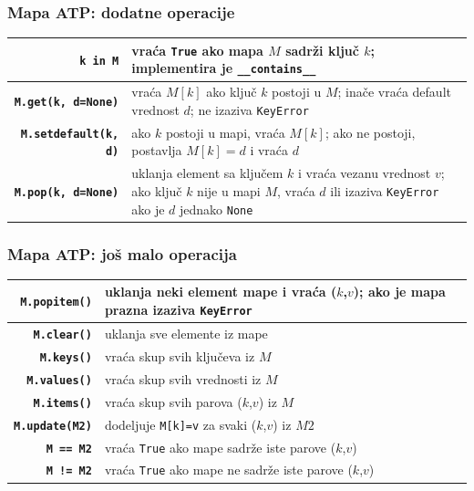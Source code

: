 \documentclass[compress,aspectratio=169]{beamer}
\begin{document}
\begin{frame}[fragile]
  \frametitle{Mapa ATP: dodatne operacije}
  \begin{center}
    \begin{tabular}{rp{10cm}}
      \textbf{\texttt{k in M}} & vraća \texttt{True} ako mapa $M$ sadrži ključ $k$; implementira je \texttt{\_\_contains\_\_} \\ \hline
      \textbf{\texttt{M.get(k, d=None)}} & vraća $M[k]$ ako ključ $k$ postoji u $M$; inače vraća default vrednost $d$; ne izaziva \texttt{KeyError} \\ \hline
      \textbf{\texttt{M.setdefault(k, d)}} & ako $k$ postoji u mapi, vraća $M[k]$; ako ne postoji, postavlja $M[k]=d$ i vraća $d$ \\ \hline
      \textbf{\texttt{M.pop(k, d=None)}} & uklanja element sa ključem $k$ i vraća vezanu vrednost $v$; ako ključ $k$ nije u mapi $M$, vraća $d$ ili izaziva \texttt{KeyError} ako je $d$ jednako \texttt{None}
    \end{tabular}
  \end{center}
\end{frame}

\begin{frame}[fragile]
  \frametitle{Mapa ATP: još malo operacija}
  \begin{center}
    \begin{tabular}{rp{11cm}}
      \textbf{\texttt{M.popitem()}} & uklanja neki element mape i vraća ($k$,$v$); ako je mapa prazna izaziva \texttt{KeyError} \\ \hline
      \textbf{\texttt{M.clear()}} & uklanja sve elemente iz mape \\ \hline
      \textbf{\texttt{M.keys()}} & vraća skup svih ključeva iz $M$ \\ \hline
      \textbf{\texttt{M.values()}} & vraća skup svih vrednosti iz $M$ \\ \hline
      \textbf{\texttt{M.items()}} & vraća skup svih parova ($k$,$v$) iz $M$ \\ \hline
      \textbf{\texttt{M.update(M2)}} & dodeljuje \texttt{M[k]=v} za svaki ($k$,$v$) iz $M2$ \\ \hline
      \textbf{\texttt{M == M2}} & vraća \texttt{True} ako mape sadrže iste parove ($k$,$v$) \\ \hline
      \textbf{\texttt{M != M2}} & vraća \texttt{True} ako mape ne sadrže iste parove ($k$,$v$)
    \end{tabular}
  \end{center}
\end{frame}
\end{document}
